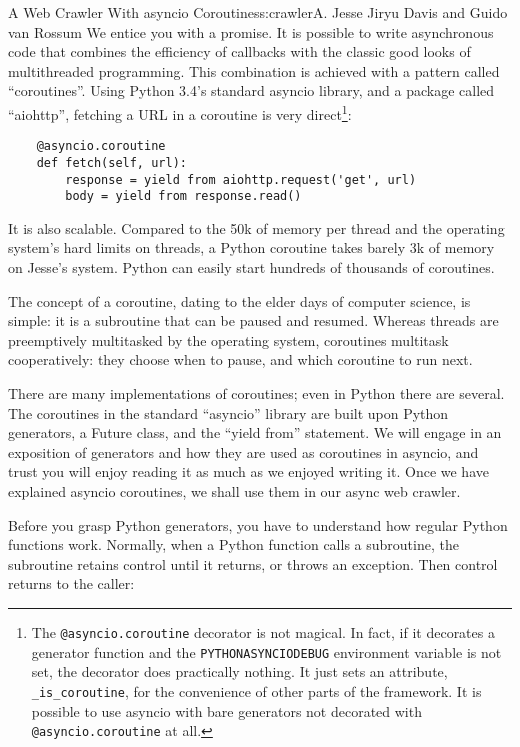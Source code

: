 \begin{aosachapter}{A Web Crawler With asyncio Coroutines}{s:crawler}{A. Jesse Jiryu Davis and Guido van Rossum}
We entice you with a promise. It is possible to write asynchronous code
that combines the efficiency of callbacks with the classic good looks of
multithreaded programming. This combination is achieved with a pattern
called ``coroutines''. Using Python 3.4's standard asyncio library, and
a package called ``aiohttp'', fetching a URL in a coroutine is very
direct\footnote{The \texttt{@asyncio.coroutine} decorator is not
  magical. In fact, if it decorates a generator function and the
  \texttt{PYTHONASYNCIODEBUG} environment variable is not set, the
  decorator does practically nothing. It just sets an attribute,
  \texttt{\_is\_coroutine}, for the convenience of other parts of the
  framework. It is possible to use asyncio with bare generators not
  decorated with \texttt{@asyncio.coroutine} at all.}:

\begin{verbatim}
    @asyncio.coroutine
    def fetch(self, url):
        response = yield from aiohttp.request('get', url)
        body = yield from response.read()
\end{verbatim}

It is also scalable. Compared to the 50k of memory per thread and the
operating system's hard limits on threads, a Python coroutine takes
barely 3k of memory on Jesse's system. Python can easily start hundreds
of thousands of coroutines.

The concept of a coroutine, dating to the elder days of computer
science, is simple: it is a subroutine that can be paused and resumed.
Whereas threads are preemptively multitasked by the operating system,
coroutines multitask cooperatively: they choose when to pause, and which
coroutine to run next.

There are many implementations of coroutines; even in Python there are
several. The coroutines in the standard ``asyncio'' library are built
upon Python generators, a Future class, and the ``yield from''
statement. We will engage in an exposition of generators and how they
are used as coroutines in asyncio, and trust you will enjoy reading it
as much as we enjoyed writing it. Once we have explained asyncio
coroutines, we shall use them in our async web crawler.

\label{how-python-generators-work}

Before you grasp Python generators, you have to understand how regular
Python functions work. Normally, when a Python function calls a
subroutine, the subroutine retains control until it returns, or throws
an exception. Then control returns to the caller:


\end{aosachapter}
